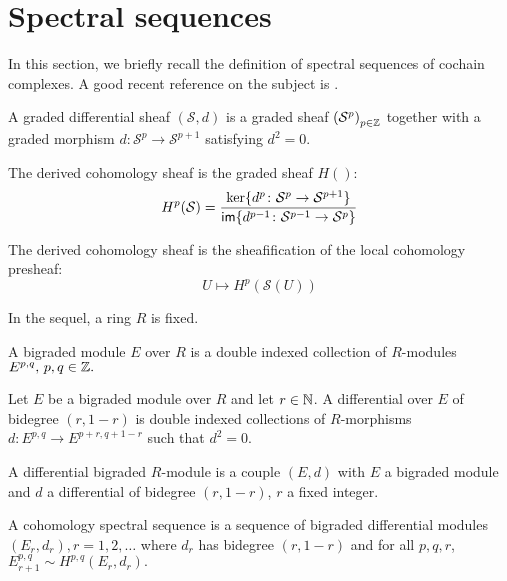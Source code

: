 \section{Spectral sequences}
\label{sec:spectral}
In this section, we briefly recall the definition of spectral sequences of cochain complexes. A good recent reference on the subject is \citep{McCleary_2000}.
\begin{defn}
    \label{def:differential_sheaf}
    A graded differential sheaf $\left(\mathcal{S}, d\right)$ is a graded sheaf $\left(\mathcal{S}^p\right)_{p \in \Z}$ together with a graded morphism $d \colon \mathcal{S}^p \to \mathcal{S}^{p+1}$ satisfying $d^2 = 0.$
    \end{defn}
\begin{defn}
The derived cohomology sheaf is the graded sheaf $H\left(\right)$:
\begin{equation}
    \label{eq:derived_cohomology}
    H^p(\mathcal{S}) = \frac{\ker\{d^p \colon \mathcal{S}^p \to \mathcal{S}^{p+1}\}}
    {\operatorname{\textsf{im}}\{d^{p-1} \colon \mathcal{S}^{p-1} \to \mathcal{S}^p\} }
\end{equation}
\end{defn}
\begin{rem}
The derived cohomology sheaf is the sheafification of the local cohomology presheaf:
\[
U \mapsto H^p \left(\mathcal{S}(U)\right)
\]
\end{rem}
In the sequel, a ring $R$ is fixed.
\begin{defn}
 A bigraded module $E$ over $R$ is a double indexed collection of $R$-modules $E^{p,q}, \, p,q \in \mathbb{Z}.$
\end{defn}
\begin{defn}
Let $E$ be a bigraded module over $R$ and let $r \in \mathbb{N}$. A differential over $E$ of bidegree $(r,1-r)$ is double indexed collections of $R$-morphisms $d \colon E^{p,q} \to E^{p+r,q+1-r}$ such that $d^2 = 0.$
\end{defn}
\begin{defn}
A differential bigraded $R$-module is a couple $(E,d)$ with $E$ a bigraded module and $d$ a differential of bidegree $(r,1-r)$, $r$ a fixed integer.
\end{defn}
\begin{defn} A cohomology spectral sequence is a sequence of bigraded differential modules $(E_r,d_r), r=1,2,\dots$ where $d_r$ has bidegree $(r,1-r)$ and for all $p,q,r$, $E^{p,q}_{r+1} \sim H^{p,q}(E_r,d_r).$
\end{defn}
